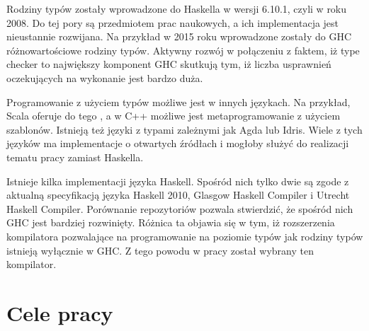 Rodziny typów zostały wprowadzone do Haskella w wersji 6.10.1, czyli w roku
2008. Do tej pory są przedmiotem prac naukowych, a ich implementacja jest
nieustannie rozwijana. Na przykład w 2015 roku wprowadzone zostały do GHC
różnowartościowe rodziny typów. Aktywny rozwój w połączeniu z faktem, iż type
checker to największy komponent GHC\cite{AOSA} skutkują tym, iż liczba
usprawnień oczekujących na wykonanie jest bardzo duża.

Programowanie z użyciem typów możliwe jest w innych językach. Na przykład, Scala
oferuje do tego , a w C++ możliwe jest
metaprogramowanie z użyciem szablonów. Istnieją też języki z typami zależnymi
jak Agda lub Idris. Wiele z tych języków ma implementacje o otwartych źródłach i
mogłoby służyć do realizacji tematu pracy zamiast Haskella.


Istnieje kilka implementacji języka Haskell. Spośród nich tylko dwie są zgode z
aktualną specyfikacją języka Haskell 2010, Glasgow Haskell Compiler i Utrecht
Haskell Compiler\cite{WikiImplementations}. Porównanie repozytoriów pozwala
stwierdzić, że spośród nich GHC jest bardziej rozwinięty. Różnica ta objawia się
w tym, iż rozszerzenia kompilatora pozwalające na programowanie na poziomie
typów jak rodziny typów istnieją wyłącznie w GHC\cite{UHCUserGuide}. Z tego
powodu w pracy został wybrany ten kompilator. 


\section{Cele pracy}\label{sec:cele_pracy}



